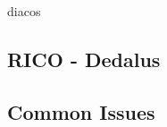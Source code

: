 diacos \cite{10.1007/978-3-642-82852-2_111}

\subsection{RICO - Dedalus}


\subsection{Common Issues}


%
%
%
